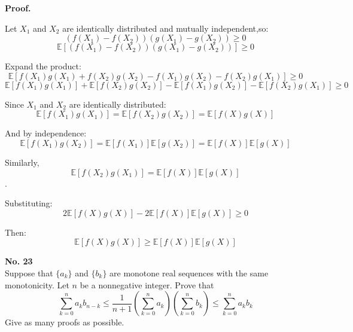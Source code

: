 \documentclass[a4paper, 11pt]{article}
\newenvironment{problem}[2][No.]
    { \begin{mdframed}[backgroundcolor=gray!5] \textbf{#1 #2} \\}
    {  \end{mdframed}}
\newenvironment{solution}
    {\textbf{Proof.}}
    {}
\begin{document}
\begin{solution}

	Let  \( X_1 \) and \( X_2 \) are identically distributed and mutually independent,so:  
 $$ (f(X_1) - f(X_2))(g(X_1) - g(X_2)) \geq 0 $$
$$\mathbb{E}\left[(f(X_1) - f(X_2))(g(X_1) - g(X_2))\right] \geq 0 
$$ 

	Expand the product: $$ \mathbb{E}\left[ f(X_1)g(X_1) + f(X_2)g(X_2) - f(X_1)g(X_2) - f(X_2)g(X_1) \right] \geq 0 $$  
 $$ \mathbb{E}\left[ f(X_1)g(X_1) \right] + \mathbb{E}\left[ f(X_2)g(X_2) \right] - \mathbb{E}\left[ f(X_1)g(X_2) \right] - \mathbb{E}\left[ f(X_2)g(X_1) \right] \geq 0 $$
	
	Since \( X_1 \) and \( X_2 \) are identically distributed: $$ \mathbb{E}\left[ f(X_1)g(X_1) \right] = \mathbb{E}\left[ f(X_2)g(X_2) \right] = \mathbb{E}\left[ f(X)g(X) \right] $$  
	
	And by independence: $$ \mathbb{E}\left[ f(X_1)g(X_2) \right] = \mathbb{E}\left[ f(X_1) \right]\mathbb{E}\left[ g(X_2) \right] = \mathbb{E}\left[ f(X) \right]\mathbb{E}\left[ g(X) \right] $$  
	
	Similarly, $$ \mathbb{E}\left[ f(X_2)g(X_1) \right] = \mathbb{E}\left[ f(X) \right]\mathbb{E}\left[ g(X) \right] $$.  
	
	Substituting: $$ 2\mathbb{E}[f(X)g(X)] - 2\mathbb{E}[f(X)]\mathbb{E}[g(X)] \geq 0 $$  
	
Then: $$ \mathbb{E}[f(X)g(X)] \geq \mathbb{E}[f(X)]\mathbb{E}[g(X)] $$ 
\end{solution}

\begin{problem}{23}
Suppose that $\{a_k\}$ and $\{b_k\}$ are monotone real sequences with the same monotonicity. Let $n$ be a nonnegative integer. Prove that
$$
\sum_{k = 0}^n a_k b_{n - k} \leq \frac{1}{n + 1} \left( \sum_{k = 0}^n a_k \right) \left( \sum_{k = 0}^n b_k \right) \leq \sum_{k = 0}^n a_k b_k
$$
Give as many proofs as possible.
\end{problem}
\end{document}
